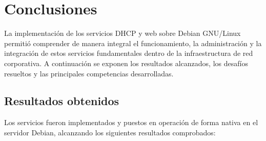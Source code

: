 
\section{Conclusiones}

La implementación de los servicios DHCP y web sobre Debian GNU/Linux permitió
comprender de manera integral el funcionamiento, la administración y la
integración de estos servicios fundamentales dentro de la infraestructura de
red corporativa. A continuación se exponen los resultados alcanzados, los
desafíos resueltos y las principales competencias desarrolladas.

\subsection{Resultados obtenidos}

Los servicios fueron implementados y puestos en operación de forma nativa en
el servidor Debian, alcanzando los siguientes resultados comprobados:

